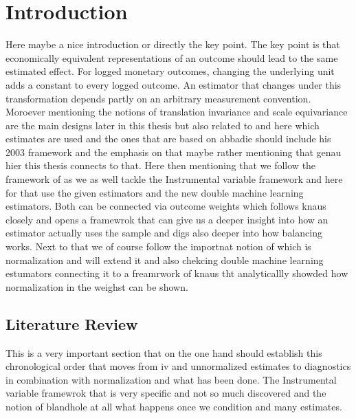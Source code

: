 \documentclass[12pt, a4paper, oneside]{article}
\theoremstyle{plain}
\theoremstyle{definition}
\begin{document}
\newpage
\listoffigures
{}

\newpage
\listoftables
{}



\newpage
{}
\setcounter{page}{1}

\section{Introduction}
Here maybe a nice introduction or directly the key point.
The key point is that economically equivalent representations of an outcome should lead to the same estimated effect. For logged monetary outcomes, changing the underlying unit adds a constant to every logged outcome. 
An estimator that changes under this transformation depends partly on an arbitrary measurement convention.
Moroever mentioning the notions of translation invariance and scale equivariance are the main designs later in this thesis but also related to \citet{sloczynski2025abadie} and here which estimates are used and the ones that are based on abbadie should include his 2003 framework and the emphasis on that maybe rather mentioning that genau hier this thesis connects to that.
Here then mentioning that we follow the framework of \citet{sloczynski2025abadie} as we as well tackle the Instrumental variable framework and here for that use the given estimators and the new double machine learning
estimators.
Both can be connected via outcome weights which follows knaus closely and opens a framewrok that can give us a deeper insight into how an estimator actually uses the sample and digs also deeper into how balancing works. Next to that we of course follow the importnat notion of \citet{sloczynski2025abadie} which is normalization and will extend it and also chekcing double machine learning estumators connecting it to a freamrwork of knaus tht analyticallly showded how normalization in the weighst can be shown.






\subsection{Literature Review}
This is a very important section that on the one hand should establish this chronological order that moves from iv and unnormalized estimates to diagnostics in combination with normalization and what has been done.
The Instrumental variable framewrok that is very specific and not so much discovered and the notion of blandhole at all what happens once we condition and many estimates.\\
\end{document}
